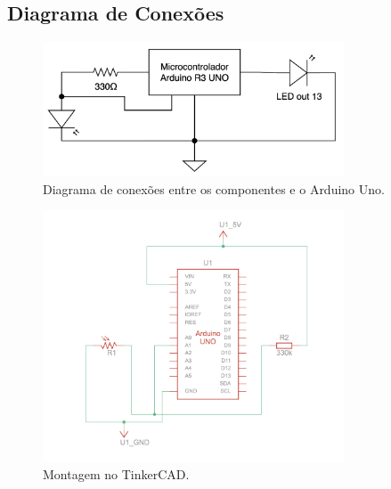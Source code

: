 \documentclass[12pt, a4paper]{article}
\begin{document}
\subsection{Diagrama de Conexões}
\begin{figure}[H]
	\centering
	\includegraphics[width=0.8\textwidth]{diagrama_aula04.png}
	\caption{Diagrama de conexões entre os componentes e o Arduino Uno.}
	\label{fig:diagrama_conexoes}
\end{figure}
\begin{figure}[H]
	\centering
	\includegraphics[width=0.8\textwidth]{diagrama_tinkercad_aula03.png}
	\caption{Montagem no TinkerCAD.}
	\label{fig:montagem_protoboard}
\end{figure}
\end{document}
